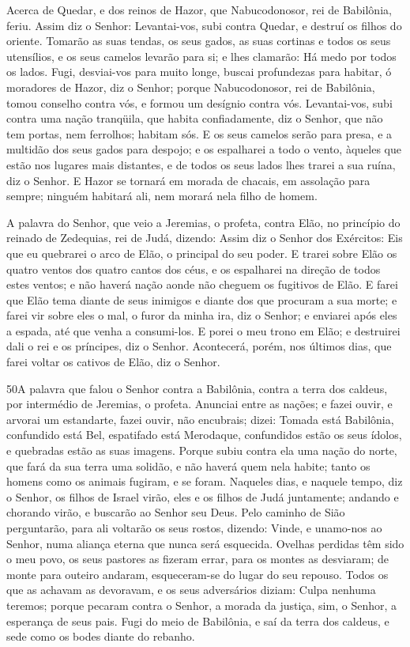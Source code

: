 Acerca de Quedar, e dos reinos de Hazor, que Nabucodonosor, rei
de Babilônia, feriu. Assim diz o Senhor: Levantai-vos, subi contra
Quedar, e destruí os filhos do oriente. Tomarão as suas
tendas, os seus gados, as suas cortinas e todos os seus utensílios,
e os seus camelos levarão para si; e lhes clamarão: Há medo por
todos os lados. Fugi, desviai-vos para muito longe, buscai
profundezas para habitar, ó moradores de Hazor, diz o Senhor; porque
Nabucodonosor, rei de Babilônia, tomou conselho contra vós, e formou
um desígnio contra vós. Levantai-vos, subi contra uma nação
tranqüila, que habita confiadamente, diz o Senhor, que não tem
portas, nem ferrolhos; habitam sós. E os seus camelos serão
para presa, e a multidão dos seus gados para despojo; e os
espalharei a todo o vento, àqueles que estão nos lugares mais
distantes, e de todos os seus lados lhes trarei a sua ruína, diz o
Senhor. E Hazor se tornará em morada de chacais, em assolação
para sempre; ninguém habitará ali, nem morará nela filho de homem.

A palavra do Senhor, que veio a Jeremias, o profeta, contra Elão,
no princípio do reinado de Zedequias, rei de Judá, dizendo:
Assim diz o Senhor dos Exércitos: Eis que eu quebrarei o arco
de Elão, o principal do seu poder. E trarei sobre Elão os
quatro ventos dos quatro cantos dos céus, e os espalharei na direção
de todos estes ventos; e não haverá nação aonde não cheguem os
fugitivos de Elão. E farei que Elão tema diante de seus
inimigos e diante dos que procuram a sua morte; e farei vir sobre
eles o mal, o furor da minha ira, diz o Senhor; e enviarei após eles
a espada, até que venha a consumi-los. E porei o meu trono em
Elão; e destruirei dali o rei e os príncipes, diz o Senhor.
Acontecerá, porém, nos últimos dias, que farei voltar os
cativos de Elão, diz o Senhor.

\medskip

\lettrine{50} A palavra que falou o Senhor contra a Babilônia,
contra a terra dos caldeus, por intermédio de Jeremias, o profeta.
Anunciai entre as nações; e fazei ouvir, e arvorai um
estandarte, fazei ouvir, não encubrais; dizei: Tomada está
Babilônia, confundido está Bel, espatifado está Merodaque,
confundidos estão os seus ídolos, e quebradas estão as suas imagens.
Porque subiu contra ela uma nação do norte, que fará da sua
terra uma solidão, e não haverá quem nela habite; tanto os homens
como os animais fugiram, e se foram. Naqueles dias, e naquele
tempo, diz o Senhor, os filhos de Israel virão, eles e os filhos de
Judá juntamente; andando e chorando virão, e buscarão ao Senhor seu
Deus. Pelo caminho de Sião perguntarão, para ali voltarão os
seus rostos, dizendo: Vinde, e unamo-nos ao Senhor, numa aliança
eterna que nunca será esquecida. Ovelhas perdidas têm sido o meu
povo, os seus pastores as fizeram errar, para os montes as
desviaram; de monte para outeiro andaram, esqueceram-se do lugar do
seu repouso. Todos os que as achavam as devoravam, e os seus
adversários diziam: Culpa nenhuma teremos; porque pecaram contra o
Senhor, a morada da justiça, sim, o Senhor, a esperança de seus
pais. Fugi do meio de Babilônia, e saí da terra dos caldeus, e
sede como os bodes diante do rebanho.

